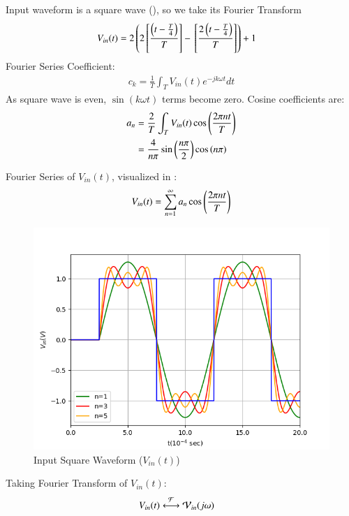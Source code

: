 \documentclass[journal,12pt,twocolumn]{IEEEtran}
\theoremstyle{remark}
\begin{document}
\solution


Input waveform is a square wave (), so we take its Fourier Transform 
\begin{align}
    V_{in}(t) &= 2\left(2{}\left[\frac{\left(t-\frac{T}{4}\right)}{T}\right] - {}\left[\frac{2\left(t - \frac{T}{4}\right)}{T}\right]\right) + 1
\end{align}
Fourier Series Coefficient:
\begin{align}
    c_k = \frac{1}{T} \int_{T} V_{in}(t)e^{-jk\omega t}dt
\end{align}
As square wave is even, $\sin(k\omega t)$ terms become zero. Cosine coefficients are:
\begin{align}
    a_n &= \frac{2}{T} \int_{T} V_{in}(t) \cos\left(\frac{2\pi nt}{T}\right)\\
    &= \frac{4}{n\pi}\sin{\ensuremath{\left(\frac{n\pi}{2}\right)}}\cos\left({n\pi}\right)
\end{align}

Fourier Series of $V_{in}(t)$, visualized in :
\begin{align}
    V_{in}(t) = \sum_{n = 1}^{\infty}a_n \cos\left(\frac{2\pi nt}{T}\right)\label{eq:5_gate.23.ph.37}
\end{align}

\begin{figure}[!h]
    \centering
    \includegraphics[width = \columnwidth]{figs/f_s.png}
    \caption{Input Square Waveform ($V_{in}(t)$)}
    \label{fig:square_gate.ph.23.37}
\end{figure}

Taking Fourier Transform of $V_{in}(t)$:
\begin{align}
    V_{in}(t) &\system{F} \mathcal{V}_{in}(j\omega)
\end{align}
\end{document}
